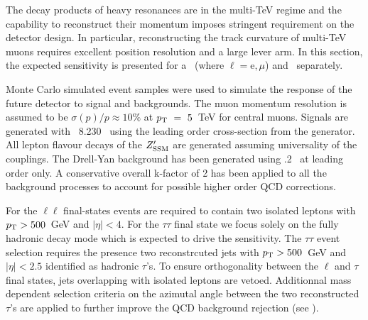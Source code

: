 The decay products of heavy resonances are in the multi-TeV regime and the capability to reconstruct their momentum imposes stringent requirement on the detector design. In particular, reconstructing the track curvature of multi-TeV muons requires excellent position resolution and a large lever arm. In this section, the expected sensitivity is presented for a \Zpll\ (where $\ell=\mathrm{e},\mu$) and \Zptata\ separately.

Monte Carlo simulated event samples were used to simulate the response of the future detector to signal and backgrounds. The muon momentum resolution is assumed to be $\sigma(p)/p \approx 10\%$ at $p_\text{T}~=~5$~TeV for central muons. Signals are generated with \pythia~8.230~\cite{Sjostrand:2014zea} using the leading order cross-section from the generator.
All lepton flavour decays of the $Z^{\prime}_{\mathrm{SSM}}$ are generated assuming universality of the couplings.
The Drell-Yan background has been generated using .2~\cite{Alwall:2014hca} at leading order only. A conservative overall k-factor of 2 has been applied to all the background processes to account for possible higher order QCD corrections.

For the $\ell\ell$ final-states events are required to contain two isolated leptons with $p_\text{T} > 500$~GeV and $|\eta|<4$. For the $\tau\tau$ final state we focus solely on the fully hadronic decay mode which is expected to drive the sensitivity. The $\tau\tau$ event selection requires the presence two reconstrcuted jets with $p_\text{T} > 500$~GeV and $|\eta|<2.5$ identified as hadronic $\tau$'s. To ensure orthogonality between the $\ell$ and $\tau$ final states, jets overlapping with isolated leptons are vetoed. Additionnal mass dependent selection criteria on the azimutal angle between the two reconstructed $\tau$'s are applied to further improve the QCD background rejection (see ).

